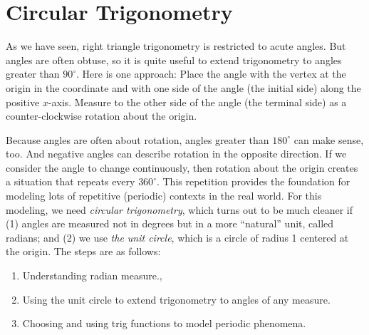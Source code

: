 \newpage 

\section{Circular Trigonometry}
As we have seen, right triangle trigonometry is restricted to acute angles.  But angles are often obtuse, so it is quite useful to extend trigonometry to angles greater than $90^\circ$.  Here is one approach:  Place the angle with the vertex at the origin in the coordinate and with one side of the angle (the initial side) along the positive $x$-axis.  Measure to the other side of the angle (the terminal side) as a counter-clockwise rotation about the origin.   

%

Because angles are often about rotation, angles greater than $180^\circ$ can make sense, too.  And negative angles can describe rotation in the opposite direction.  If we consider the angle to change continuously, then rotation about the origin creates a situation that repeats every $360^\circ$.  This repetition provides the foundation for modeling lots of repetitive (periodic) contexts in the real world.  For this modeling, we need \emph{circular trigonometry}, which turns out to be much cleaner if (1) angles are measured not in degrees but in a more ``natural'' unit, called radians; and (2) we use \emph{the unit circle}, which is a circle of radius 1 centered at the origin.   The steps are as follows:  

\begin{enumerate}
\item Understanding radian measure., 

\item Using the unit circle to extend trigonometry to angles of any measure.

\item Choosing and using trig functions to model periodic phenomena.

\end{enumerate}


